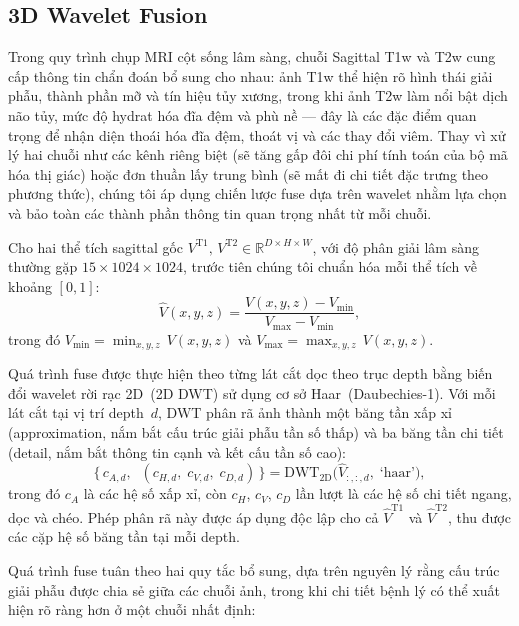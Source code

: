 \subsection{3D Wavelet Fusion}

Trong quy trình chụp MRI cột sống lâm sàng, chuỗi Sagittal T1w và T2w cung cấp thông tin chẩn đoán bổ sung cho nhau: ảnh T1w thể hiện rõ hình thái giải phẫu, thành phần mỡ và tín hiệu tủy xương, trong khi ảnh T2w làm nổi bật dịch não tủy, mức độ hydrat hóa đĩa đệm và phù nề --- đây là các đặc điểm quan trọng để nhận diện thoái hóa đĩa đệm, thoát vị và các thay đổi viêm. Thay vì xử lý hai chuỗi như các kênh riêng biệt (sẽ tăng gấp đôi chi phí tính toán của bộ mã hóa thị giác) hoặc đơn thuần lấy trung bình (sẽ mất đi chi tiết đặc trưng theo phương thức), chúng tôi áp dụng chiến lược fuse dựa trên wavelet nhằm lựa chọn và bảo toàn các thành phần thông tin quan trọng nhất từ mỗi chuỗi.

Cho hai thể tích sagittal gốc $V^{\text{T1}},\, V^{\text{T2}} \in \mathbb{R}^{D \times H \times W}$, với độ phân giải lâm sàng thường gặp $15\!\times\!1024\!\times\!1024$, trước tiên chúng tôi chuẩn hóa mỗi thể tích về khoảng $[0, 1]$:
\begin{equation}
\hat{V}(x,y,z) = \frac{V(x,y,z) - V_{\min}}{V_{\max} - V_{\min}},
\label{eq:normalize}
\end{equation}
trong đó $V_{\min} = \min_{x,y,z}\, V(x,y,z)$ và $V_{\max} = \max_{x,y,z}\, V(x,y,z)$.

Quá trình fuse được thực hiện theo từng lát cắt dọc theo trục depth bằng biến đổi wavelet rời rạc 2D~(2D DWT) sử dụng cơ sở Haar~(Daubechies-1). Với mỗi lát cắt tại vị trí depth~$d$, DWT phân rã ảnh thành một băng tần xấp xỉ (approximation, nắm bắt cấu trúc giải phẫu tần số thấp) và ba băng tần chi tiết (detail, nắm bắt thông tin cạnh và kết cấu tần số cao):
\begin{equation}
\big\{\, c_{A,d},\;\; (c_{H,d},\; c_{V,d},\; c_{D,d})\,\big\} = \text{DWT}_{2\text{D}}\!\big(\hat{V}_{:,:,d},\; \text{`haar'}\big),
\label{eq:dwt}
\end{equation}
trong đó $c_A$ là các hệ số xấp xỉ, còn $c_H$, $c_V$, $c_D$ lần lượt là các hệ số chi tiết ngang, dọc và chéo. Phép phân rã này được áp dụng độc lập cho cả $\hat{V}^{\text{T1}}$ và $\hat{V}^{\text{T2}}$, thu được các cặp hệ số băng tần tại mỗi depth.

Quá trình fuse tuân theo hai quy tắc bổ sung, dựa trên nguyên lý rằng cấu trúc giải phẫu được chia sẻ giữa các chuỗi ảnh, trong khi chi tiết bệnh lý có thể xuất hiện rõ ràng hơn ở một chuỗi nhất định:

